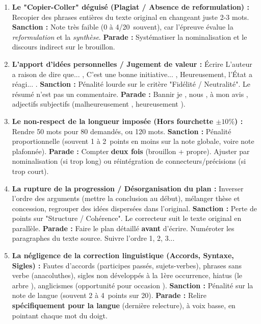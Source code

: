 \documentclass[11pt]{article}
\begin{document}
\begin{attention}
\begin{enumerate}
    \item \textbf{Le "Copier-Coller" déguisé (Plagiat / Absence de reformulation) :} Recopier des phrases entières du texte original en changeant juste 2-3 mots. \textbf{Sanction :} Note très faible (0 à 4/20~souvent), car l'épreuve évalue la \emph{reformulation} et la \emph{synthèse}. \textbf{Parade :} Systématiser la nominalisation et le discours indirect sur le brouillon.
    \item \textbf{L'apport d'idées personnelles / Jugement de valeur :} Écrire \og L'auteur a raison de dire que... \fg{}, \og C'est une bonne initiative... \fg{}, \og Heureusement, l'État a réagi... \fg{}. \textbf{Sanction :} Pénalité lourde sur le critère "Fidélité / Neutralité". Le résumé n'est pas un commentaire. \textbf{Parade :} Bannir \og je \fg{}, \og nous \fg{}, \og à mon avis \fg{}, adjectifs subjectifs (\og malheureusement \fg{}, \og heureusement \fg{}).
    \item \textbf{Le non-respect de la longueur imposée (Hors fourchette $\pm 10\%$) :} Rendre 50 mots pour 80 demandés, ou 120 mots. \textbf{Sanction :} Pénalité proportionnelle (souvent 1 à 2~points en moins sur la note globale, voire note plafonnée). \textbf{Parade :} Compter \textbf{deux fois} (brouillon + propre). Ajuster par nominalisation (si trop long) ou réintégration de connecteurs/précisions (si trop court).
    \item \textbf{La rupture de la progression / Désorganisation du plan :} Inverser l'ordre des arguments (mettre la conclusion au début), mélanger thèse et concession, regrouper des idées dispersées dans l'original. \textbf{Sanction :} Perte de points sur "Structure / Cohérence". Le correcteur suit le texte original en parallèle. \textbf{Parade :} Faire le plan détaillé \textbf{avant} d'écrire. Numéroter les paragraphes du texte source. Suivre l'ordre 1, 2, 3...
    \item \textbf{La négligence de la correction linguistique (Accords, Syntaxe, Sigles) :} Fautes d'accords (participes passés, sujets-verbes), phrases sans verbe (anacoluthes), sigles non développés à la 1ère occurrence, hiatus (\og le arbre \fg{}), anglicismes (\og opportunité \fg{} pour \og occasion \fg{}). \textbf{Sanction :} Pénalité sur la note de langue (souvent 2 à 4~points sur 20). \textbf{Parade :} Relire \textbf{spécifiquement pour la langue} (dernière relecture), à voix basse, en pointant chaque mot du doigt.
\end{enumerate}
\end{attention}
\end{document}

